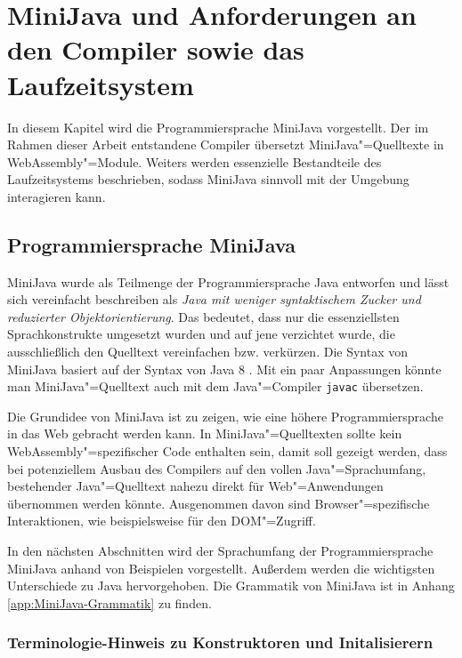 \chapter{MiniJava und Anforderungen an den Compiler sowie das Laufzeitsystem}
\label{cha:MiniJava}

In diesem Kapitel wird die Programmiersprache MiniJava vorgestellt. Der im Rahmen dieser Arbeit entstandene Compiler übersetzt MiniJava"=Quelltexte in WebAssembly"=Module. Weiters werden essenzielle Bestandteile des Laufzeitsystems beschrieben, sodass MiniJava sinnvoll mit der Umgebung interagieren kann.

\section{Programmiersprache MiniJava}
\label{sec:Programmiersprache-MiniJava}

MiniJava wurde als Teilmenge der Programmiersprache Java entworfen und lässt sich vereinfacht beschreiben als \emph{Java mit weniger syntaktischem Zucker und reduzierter Objektorientierung}. Das bedeutet, dass nur die essenziellsten Sprachkonstrukte umgesetzt wurden und auf jene verzichtet wurde, die ausschließlich den Quelltext vereinfachen bzw. verkürzen. Die Syntax von MiniJava basiert auf der Syntax von Java 8 \cite{Java8Specification}. Mit ein paar Anpassungen könnte man MiniJava"=Quelltext auch mit dem Java"=Compiler \lstinline{javac} übersetzen.

Die Grundidee von MiniJava ist zu zeigen, wie eine höhere Programmiersprache in das Web gebracht werden kann. In MiniJava"=Quelltexten sollte kein WebAssembly"=spezifischer Code enthalten sein, damit soll gezeigt werden, dass bei potenziellem Ausbau des Compilers auf den vollen Java"=Sprachumfang, bestehender Java"=Quelltext nahezu direkt für Web"=Anwendungen übernommen werden könnte. Ausgenommen davon sind Browser"=spezifische Interaktionen, wie beispielsweise für den DOM"=Zugriff.

In den nächsten Abschnitten wird der Sprachumfang der Programmiersprache MiniJava anhand von Beispielen vorgestellt. Außerdem werden die wichtigsten Unterschiede zu Java hervorgehoben. Die Grammatik von MiniJava ist in Anhang \ref{app:MiniJava-Grammatik} zu finden.

\pagebreak
\subsection{Terminologie-Hinweis zu Konstruktoren und Initalisierern}

